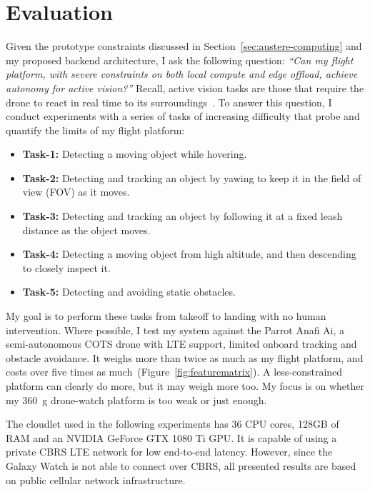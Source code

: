 
\section{Evaluation}
\label{sec:eval}

Given the prototype constraints discussed in Section~\ref{sec:austere-computing} and my proposed backend architecture, I ask the following question: 
{\em ``Can my flight platform, with severe constraints on both local compute and edge offload, achieve autonomy for active vision?''} Recall, active vision tasks are those that require the drone to react in real time to its surroundings~\cite{Aloimonos1988, Ognibene2013}. To answer this question, I conduct experiments with a series of tasks of increasing difficulty that probe and quantify the limits of my flight platform:

\begin{itemize}

\item{{\bf Task-1:} Detecting a moving object while hovering.}

\item{{\bf Task-2:} Detecting and tracking an object by yawing to keep it in
    the field of view (FOV) as it moves.}

\item{{\bf Task-3:} Detecting and tracking an object by following it at a
    fixed leash distance as the object moves.}

\item{{\bf Task-4:} Detecting a moving object from high altitude, and
    then descending to closely inspect it.  }

\item{{\bf Task-5:} Detecting and avoiding static obstacles.}

\end{itemize}

My goal is to perform these tasks from takeoff to landing with no
human intervention.  Where possible, I test my
system against the Parrot Anafi Ai, a semi-autonomous COTS drone with LTE support, limited onboard tracking and obstacle avoidance.  It weighs more
than twice as much as my flight platform, and costs over five times as much~(Figure~\ref{fig:featurematrix}).  A less-constrained platform
can clearly do more, but it may weigh more too.  My focus is on
whether my 360~g drone-watch platform is too weak or just enough.

The cloudlet used in the following experiments has 36 CPU cores, 128GB of RAM and an NVIDIA GeForce GTX 1080
Ti GPU.  It is capable of using a private CBRS LTE network for low end-to-end latency. However, since the Galaxy Watch is not able to connect over CBRS, all presented results are based on public cellular network infrastructure.

